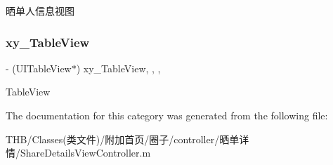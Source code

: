 晒单人信息视图 \mbox{\label{category_share_details_view_controller_07_08_a92623213c6be8bd80c423249a17bc1e8}} 
\subsubsection{\texorpdfstring{xy\+\_\+\+Table\+View}{xy\_TableView}}
{\footnotesize\ttfamily -\/ (U\+I\+Table\+View$\ast$) xy\+\_\+\+Table\+View\hspace{0.3cm}{\ttfamily [read]}, {\ttfamily [write]}, {\ttfamily [nonatomic]}, {\ttfamily [strong]}}

Table\+View 

The documentation for this category was generated from the following file\+:\begin{DoxyCompactItemize}
\item 
T\+H\+B/\+Classes(类文件)/附加首页/圈子/controller/晒单详情/Share\+Details\+View\+Controller.\+m\end{DoxyCompactItemize}
